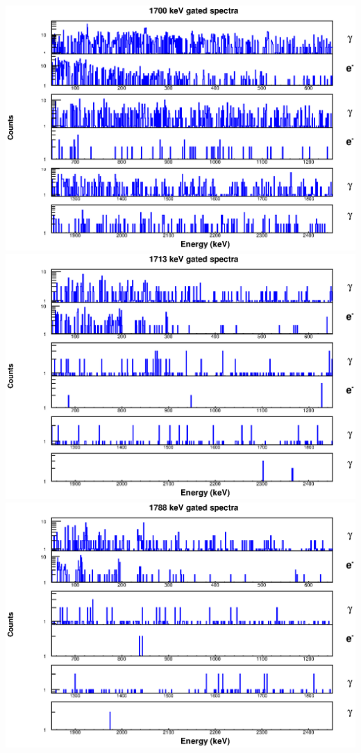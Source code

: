 \includegraphics[scale=0.8]{154Gd_Appendix/1700_combined.eps}
\includegraphics[scale=0.8]{154Gd_Appendix/1713_combined.eps}
\includegraphics[scale=0.8]{154Gd_Appendix/1788_combined.eps}
